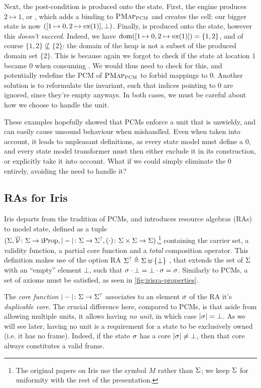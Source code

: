 Next, the post-condition is produced onto the state. First, the engine produces $2\mapsto 1$, or , which adds a binding to $\textsc{PMap}_{\textsc{PCM}}$ and creates the cell: our bigger state is now $([1\mapsto 0, 2\mapsto \text{ex}(1)],\bot)$. Finally,  is produced onto the state, however this \emph{doesn't succeed}. Indeed, we have $\operatorname{dom}([1\mapsto 0, 2\mapsto \text{ex}(1)])=\{1,2\}$, and of course $\{1,2\}\not\subseteq \{2\}$: the domain of the heap is not a subset of the produced domain set $\{2\}$. This is because again we forgot to check if the state at location $1$ became $0$ when consuming . We would thus need to check for this, and potentially redefine the PCM of $\textsc{PMap}_{\textsc{PCM}}$ to forbid mappings to $0$. Another solution is to reformulate the invariant, such that indices pointing to $0$ are ignored, since they're empty anyways. In both cases, we must be careful about how we choose to handle the unit.

These examples hopefully showed that PCMs enforce a unit that is unwieldy, and can easily cause unsound behaviour when mishandled. Even when taken into account, it leads to unpleasant definitions, as every state model must define a $0$, and every state model transformer must then either exclude it in its construction, or explicitly take it into account. What if we could simply eliminate the $0$ entirely, avoiding the need to handle it?

\subsection{RAs for Iris}

Iris \cite{iris1,iris2,iris3,iris} departs from the tradition of PCMs, and introduces resource algebras (RAs) to model state, defined as a tuple ${(\Sigma, \overline{\cal V}\colon \Sigma\rightarrow \text{iProp}, |-|\colon \Sigma\rightarrow \Sigma^?, (\cdot)\colon \Sigma\times \Sigma\rightarrow \Sigma)}$,\footnote{The original papers on Iris use the symbol $M$ rather than $\Sigma$; we keep $\Sigma$ for uniformity with the rest of the presentation.} containing the carrier set, a validity function, a partial core function and a \emph{total} composition operator. This definition makes use of the option RA $\Sigma^?\triangleq \Sigma\uplus\{\bot\}$ \cite{iris-option}, that extends the set of $\Sigma$ with an ``empty'' element $\bot$, such that $\sigma\cdot\bot=\bot\cdot \sigma=\sigma$. Similarly to PCMs, a set of axioms must be satisfied, as seen in \autoref{fig:irisra-properties}.

The \emph{core function} $|-|\colon \Sigma\rightarrow \Sigma^?$ associates to an element $\sigma$ of the RA it's \emph{duplicable core}. The crucial difference here, compared to PCMs, is that aside from allowing multiple units, it allows having \emph{no unit}, in which case $|\sigma|=\bot$. As we will see later, having no unit is a requirement for a state to be exclusively owned (i.e. it has no frame). Indeed, if the state $\sigma$ has a core $|\sigma|\neq\bot$, then that core always constitutes a valid frame.


